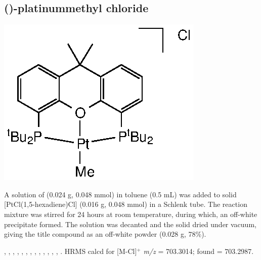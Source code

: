 \subsection*{(\tBuXantphosk)-platinummethyl chloride}
\begin{structure}[h]
\begin{center}
\includegraphics{../Structures/CtBuPtMe.eps}
\end{center}
\end{structure}

A solution of \tBuxantphos{} (0.024 g, 0.048 mmol) in toluene (0.5 mL) was added to solid [PtCl(1,5-hexadiene)Cl] (0.016 g, 0.048 mmol) in a Schlenk tube.  The reaction mixture was stirred for 24 hours at room temperature, during which, an off-white precipitate formed.  The solution was decanted and the   solid dried under vacuum, giving the title compound as an off-white powder (0.028 g, 78\%).

,
,
,
,
,
,
,
,
,
,
,
,
,
.
HRMS calcd for  [M-Cl]$^+$ \emph{m/z} = 703.3014; found = 703.2987.


